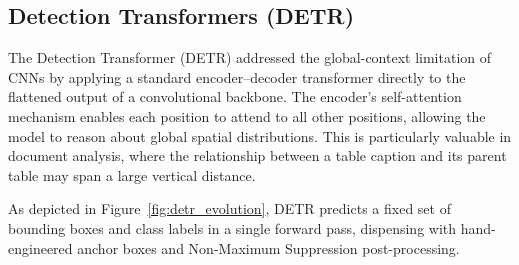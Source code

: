 \subsection{Detection Transformers (DETR)}

The Detection Transformer (DETR) \citep{detr_carion} addressed the global-context limitation of CNNs by applying a standard encoder--decoder transformer directly to the flattened output of a convolutional backbone. The encoder's self-attention mechanism enables each position to attend to all other positions, allowing the model to reason about global spatial distributions. This is particularly valuable in document analysis, where the relationship between a table caption and its parent table may span a large vertical distance.

As depicted in Figure~\ref{fig:detr_evolution}, DETR predicts a fixed set of bounding boxes and class labels in a single forward pass, dispensing with hand-engineered anchor boxes and Non-Maximum Suppression post-processing.

